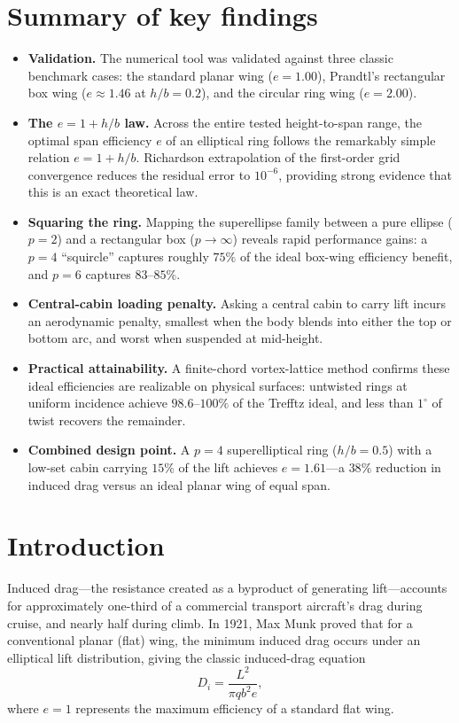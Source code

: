 \documentclass[11pt]{article}
\begin{document}
\section*{Summary of key findings}
\begin{itemize}
\itemsep2pt
\item \textbf{Validation.} The numerical tool was validated against three
classic benchmark cases: the standard planar wing ($e=1.00$), Prandtl's
rectangular box wing ($e\approx1.46$ at $h/b=0.2$), and the circular ring
wing ($e=2.00$).
\item \textbf{The $e=1+h/b$ law.} Across the entire tested height-to-span
range, the optimal span efficiency $e$ of an elliptical ring follows the
remarkably simple relation $e = 1 + h/b$. Richardson extrapolation of the
first-order grid convergence reduces the residual error to $10^{-6}$,
providing strong evidence that this is an exact theoretical law.
\item \textbf{Squaring the ring.} Mapping the superellipse family between a
pure ellipse ($p=2$) and a rectangular box ($p\to\infty$) reveals rapid
performance gains: a $p=4$ ``squircle'' captures roughly $75\%$ of the
ideal box-wing efficiency benefit, and $p=6$ captures $83$--$85\%$.
\item \textbf{Central-cabin loading penalty.} Asking a central cabin to
carry lift incurs an aerodynamic penalty, smallest when the body blends
into either the top or bottom arc, and worst when suspended at mid-height.
\item \textbf{Practical attainability.} A finite-chord vortex-lattice
method confirms these ideal efficiencies are realizable on physical
surfaces: untwisted rings at uniform incidence achieve $98.6$--$100\%$ of
the Trefftz ideal, and less than $1^\circ$ of twist recovers the remainder.
\item \textbf{Combined design point.} A $p=4$ superelliptical ring
($h/b=0.5$) with a low-set cabin carrying $15\%$ of the lift achieves
$e=1.61$---a $38\%$ reduction in induced drag versus an ideal planar wing
of equal span.
\end{itemize}

\section{Introduction}

Induced drag---the resistance created as a byproduct of generating
lift---accounts for approximately one-third of a commercial transport
aircraft's drag during cruise, and nearly half during climb. In 1921, Max
Munk proved that for a conventional planar (flat) wing, the minimum induced
drag occurs under an elliptical lift distribution, giving the classic
induced-drag equation
\begin{equation}
D_i = \frac{L^2}{\pi q b^2 e},
\end{equation}
where $e=1$ represents the maximum efficiency of a standard flat wing.
\end{document}
